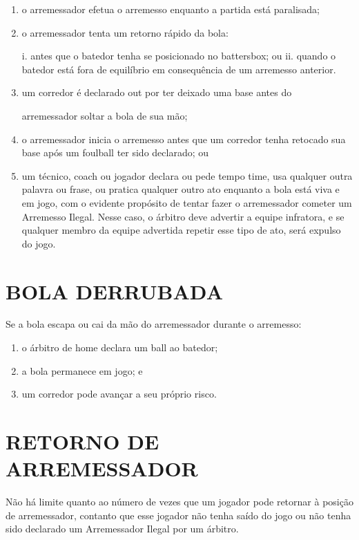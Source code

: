 \begin{enumerate}[label=(\alph*)]
	\item   o arremessador efetua o arremesso enquanto a partida está paralisada;
	\item  o arremessador tenta um retorno rápido da bola:

	 i. antes que o batedor tenha se posicionado no \gls{battersbox}; ou
	 ii. quando o batedor está fora de equilíbrio em consequência de um arremesso anterior.

	\item  um corredor é declarado \gls{out} por ter deixado uma base antes do

	arremessador soltar a bola de sua mão;
	\item  o arremessador inicia o arremesso antes que um corredor tenha retocado sua  base após um \gls{foulball} ter sido declarado; ou
	\item  um técnico, \gls{coach} ou jogador declara ou pede tempo \gls{time}, usa qualquer outra palavra ou frase, ou pratica qualquer outro ato enquanto a bola está viva e em jogo, com o evidente propósito de tentar fazer o arremessador cometer um Arremesso Ilegal. Nesse caso, o árbitro deve advertir a equipe infratora, e se qualquer membro da equipe advertida repetir esse tipo de ato, será expulso do jogo.
\end{enumerate}
\section{BOLA DERRUBADA}

 Se a bola escapa ou cai da mão do arremessador durante o arremesso:
	\begin{enumerate}[label=(\alph*)]\item   o árbitro de \gls{home} declara um \gls{ball} ao batedor;
		\item  a bola permanece em jogo; e
		\item  um corredor pode avançar a seu próprio risco.
	\end{enumerate}

\section{RETORNO DE ARREMESSADOR}

Não há limite quanto ao número de vezes que um jogador pode retornar à posição de arremessador, contanto que esse jogador não tenha saído do jogo ou não tenha sido declarado um Arremessador Ilegal por um árbitro.


